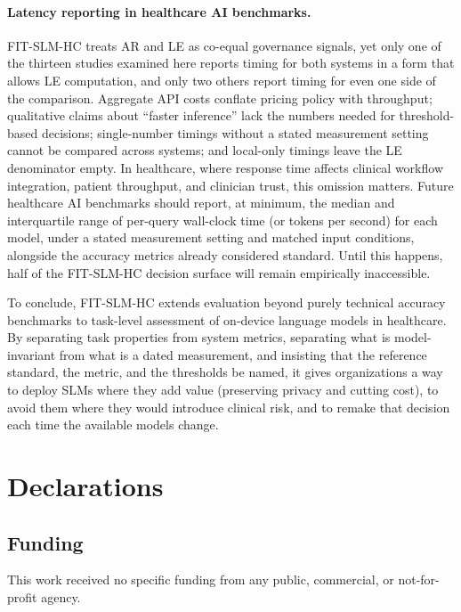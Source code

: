 \documentclass[11pt]{article}
\begin{document}
\paragraph{Latency reporting in healthcare AI benchmarks.}
FIT-SLM-HC treats AR and LE as co-equal governance signals, yet only one of the thirteen studies examined here reports timing for both systems in a form that allows LE computation, and only two others report timing for even one side of the comparison. Aggregate API costs conflate pricing policy with throughput; qualitative claims about ``faster inference'' lack the numbers needed for threshold-based decisions; single-number timings without a stated measurement setting cannot be compared across systems; and local-only timings leave the LE denominator empty. In healthcare, where response time affects clinical workflow integration, patient throughput, and clinician trust, this omission matters. Future healthcare AI benchmarks should report, at minimum, the median and interquartile range of per-query wall-clock time (or tokens per second) for each model, under a stated measurement setting and matched input conditions, alongside the accuracy metrics already considered standard. Until this happens, half of the FIT-SLM-HC decision surface will remain empirically inaccessible.

To conclude, FIT-SLM-HC extends evaluation beyond purely technical accuracy benchmarks to task-level assessment of on-device language models in healthcare. By separating task properties from system metrics, separating what is model-invariant from what is a dated measurement, and insisting that the reference standard, the metric, and the thresholds be named, it gives organizations a way to deploy SLMs where they add value (preserving privacy and cutting cost), to avoid them where they would introduce clinical risk, and to remake that decision each time the available models change.

\section*{Declarations}

\subsection*{Funding}
This work received no specific funding from any public, commercial, or not-for-profit agency.
\end{document}
